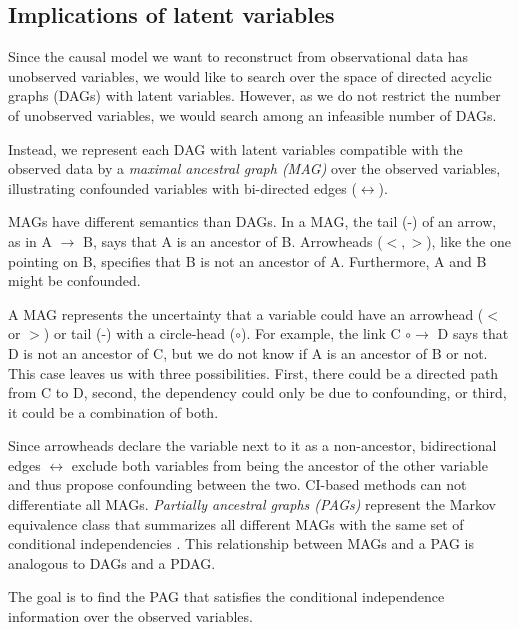 \documentclass[conference]{IEEEtran}
\begin{document}
\subsection{Implications of latent variables}
Since the causal model we want to reconstruct from observational data has unobserved variables, we would like to search over the space of directed acyclic graphs (DAGs) with latent variables.
However, as we do not restrict the number of unobserved variables, we would search among an infeasible number of DAGs.

Instead, we represent each DAG with latent variables compatible with the observed data by a \textit{maximal ancestral graph (MAG)} over the observed variables, illustrating confounded variables with bi-directed edges ($\leftrightarrow$)\cite{richardson_ancestral_2002}.

MAGs have different semantics than DAGs. In a MAG, the tail (-) of an arrow, as in A $\rightarrow$ B, says that A is an ancestor of B. Arrowheads ($<,>$), like the one pointing on B, specifies that B is not an ancestor of A. Furthermore, A and B might be confounded.

A MAG represents the uncertainty that a variable could have an arrowhead ($<$ or $>$) or tail (-) with a circle-head ($\circ$). For example, the link C $\circ$$\rightarrow$ D says that D is not an ancestor of C, but we do not know if A is an ancestor of B or not. 
This case leaves us with three possibilities. First, there could be a directed path from C to D, second, the dependency could only be due to confounding, or third, it could be a combination of both.

Since arrowheads declare the variable next to it as a non-ancestor, bidirectional edges $\leftrightarrow$ exclude both variables from being the ancestor of the other variable and thus propose confounding between the two.
CI-based methods can not differentiate all MAGs.
\textit{Partially ancestral graphs (PAGs)} represent the Markov equivalence class that summarizes all different MAGs with the same set of conditional independencies \cite{zhang_causal_2008}.
This relationship between MAGs and a PAG is analogous to DAGs and a PDAG\cite{zhang_causal_2008}.

The goal is to find the PAG that satisfies the conditional independence information over the observed variables.
\end{document}
